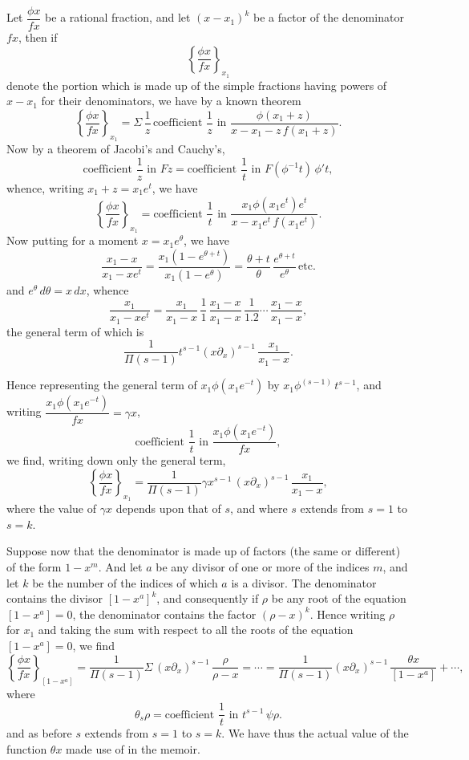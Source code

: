 \documentclass[11pt]{article}
\begin{document}
Let $\dfrac{\phi x}{f x}$ be a rational fraction, and let $(x - x_1)^k$ be a factor of the denominator $f x$, then if
\[
\left\{\frac{\phi x}{f x}\right\}_{x_1}
\]
denote the portion which is made up of the simple fractions having powers of $x - x_1$ for their denominators, we have by a known theorem
\[
\left\{\frac{\phi x}{f x}\right\}_{x_1} = \Sigma\,\frac{1}{z}\,\text{coefficient } \frac{1}{z} \text{ in } \frac{\phi(x_1 + z)}{x - x_1 - z\,f(x_1 + z)}.
\]
Now by a theorem of Jacobi's and Cauchy's,
\[
\text{coefficient } \frac{1}{z} \text{ in } F z = \text{coefficient } \frac{1}{t} \text{ in } F(\phi^{-1} t)\,\phi' t,
\]
whence, writing $x_1 + z = x_1 e^t$, we have
\[
\left\{\frac{\phi x}{f x}\right\}_{x_1} = \text{coefficient } \frac{1}{t} \text{ in } \frac{x_1 \phi(x_1 e^t) e^t}{x - x_1 e^t\,f(x_1 e^t)}.
\]
Now putting for a moment $x = x_1 e^\theta$, we have
\[
\frac{x_1 - x}{x_1 - x e^t} = \frac{x_1(1 - e^{\theta + t})}{x_1(1 - e^\theta)} = \frac{\theta + t}{\theta}\,\frac{e^{\theta + t}}{e^\theta}\,\text{etc.}
\]
and $e^\theta\,d\theta = x\,dx$, whence
\[
\frac{x_1}{x_1 - x e^t} = \frac{x_1}{x_1 - x}\,\frac{1}{1}\,\frac{x_1 - x}{x_1 - x}\,\frac{1}{1.2}\cdots\,\frac{x_1 - x}{x_1 - x},
\]
the general term of which is
\[
\frac{1}{\Pi(s - 1)}t^{s-1}(x \partial_x)^{s-1}\,\frac{x_1}{x_1 - x}.
\]

Hence representing the general term of $x_1\phi(x_1 e^{-t})$ by $x_1\phi^{(s-1)}\,t^{s-1}$, and writing $\dfrac{x_1\phi(x_1 e^{-t})}{f x} = \gamma x$,
\[
\text{coefficient } \frac{1}{t} \text{ in } \frac{x_1\phi(x_1 e^{-t})}{f x},
\]
we find, writing down only the general term,
\[
\left\{\frac{\phi x}{f x}\right\}_{x_1} = \frac{1}{\Pi(s - 1)}\gamma x^{s-1}\,(x \partial_x)^{s-1}\,\frac{x_1}{x_1 - x},
\]
where the value of $\gamma x$ depends upon that of $s$, and where $s$ extends from $s = 1$ to $s = k$.

Suppose now that the denominator is made up of factors (the same or different) of the form $1 - x^m$. And let $a$ be any divisor of one or more of the indices $m$, and let $k$ be the number of the indices of which $a$ is a divisor. The denominator contains the divisor $[1 - x^a]^k$, and consequently if $\rho$ be any root of the equation $[1 - x^a] = 0$, the denominator contains the factor $(\rho - x)^k$. Hence writing $\rho$ for $x_1$ and taking the sum with respect to all the roots of the equation $[1 - x^a] = 0$, we find
\[
\left\{\frac{\phi x}{f x}\right\}_{[1 - x^a]} = \frac{1}{\Pi(s - 1)}\Sigma\,(x \partial_x)^{s-1}\,\frac{\rho}{\rho - x}
= \cdots = \frac{1}{\Pi(s - 1)}(x \partial_x)^{s-1}\,\frac{\theta x}{[1 - x^a]} + \cdots,
\]
where
\[
\theta_s \rho = \text{coefficient } \frac{1}{t} \text{ in } t^{s-1}\,\psi\rho.
\]
and as before $s$ extends from $s = 1$ to $s = k$. We have thus the actual value of the function $\theta x$ made use of in the memoir.
\end{document}
